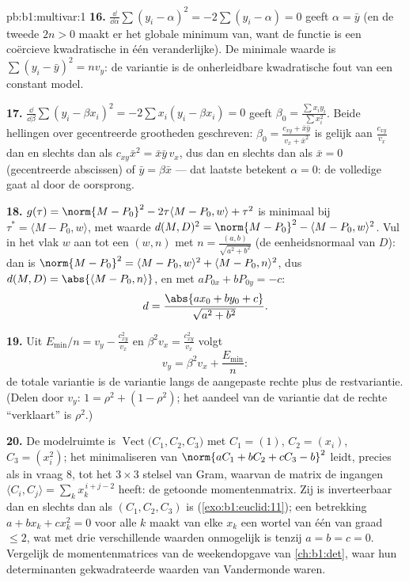 \begin{solution}{pb:b1:multivar:1}
\textbf{16.} $\frac{\dd}{\dd\alpha}\sum(y_i - \alpha)^2 =
-2\sum(y_i - \alpha) = 0$ geeft $\alpha = \bar y$ (en de tweede
 $2n > 0$ maakt er het globale minimum van, want de
functie is een coërcieve kwadratische in één veranderlijke). De
minimale waarde is $\sum(y_i - \bar y)^2 = n v_y$: de variantie is
de onherleidbare kwadratische fout van een constant model.

\textbf{17.} $\frac{\dd}{\dd\beta}\sum(y_i - \beta x_i)^2 =
-2\sum x_i(y_i - \beta x_i) = 0$ geeft $\beta_0 = \frac{\sum
x_iy_i}{\sum x_i^2}$. Beide hellingen over gecentreerde grootheden
geschreven: $\beta_0 = \frac{c_{xy} + \bar x\bar y}{v_x + \bar
x^2}$ is gelijk aan $\frac{c_{xy}}{v_x}$ dan en slechts dan als
$c_{xy}\bar x^2 = \bar x\bar y\,v_x$, dus dan en slechts dan als
$\bar x = 0$ (gecentreerde abscissen) of $\bar y = \beta\bar x$ ---
dat laatste betekent $\alpha = 0$: de volledige 
gaat al door de oorsprong.

\textbf{18.} $g(\tau) = \norm{M - P_0}^2 - 2\tau\langle M - P_0,
w\rangle + \tau^2$ is minimaal bij $\tau^* = \langle M - P_0,
w\rangle$, met waarde $d(M,D)^2 = \norm{M - P_0}^2 - \langle M -
P_0, w\rangle^2$. Vul in het vlak $w$ aan tot een 
 $(w, n)$ met $n = \frac{(a, b)}{\sqrt{a^2+b^2}}$ (de
eenheidsnormaal van $D$): dan is $\norm{M - P_0}^2 = \langle M -
P_0, w\rangle^2 + \langle M - P_0, n\rangle^2$, dus $d(M, D) =
\abs{\langle M - P_0, n\rangle}$, en met $aP_{0x} + bP_{0y} = -c$:
\[
d = \frac{\abs{a x_0 + b y_0 + c}}{\sqrt{a^2 + b^2}} .
\]

\textbf{19.} Uit $E_{\min}/n = v_y - \frac{c_{xy}^2}{v_x}$ en
$\beta^2 v_x = \frac{c_{xy}^2}{v_x}$ volgt
\[
v_y = \beta^2 v_x + \frac{E_{\min}}n :
\]
de totale variantie is de variantie langs de aangepaste rechte plus
de restvariantie. (Delen door $v_y$: $1 = \rho^2 + (1 - \rho^2)$;
het aandeel van de variantie dat de rechte ``verklaart'' is
$\rho^2$.)

\textbf{20.} De modelruimte is $\operatorname{Vect}\bigl(C_1, C_2,
C_3\bigr)$ met $C_1 = (1)$, $C_2 = (x_i)$, $C_3 = (x_i^2)$; het
minimaliseren van $\norm{aC_1 + bC_2 + cC_3 - b}^2$ leidt, precies
als in vraag 8, tot het $3\times3$ stelsel van Gram, waarvan de
matrix de ingangen $\langle C_i, C_j\rangle = \sum_k
x_k^{\,i+j-2}$ heeft: de getoonde momentenmatrix. Zij is
inverteerbaar dan en slechts dan als $(C_1, C_2, C_3)$  is
(\cref{exo:b1:euclid:11}); een betrekking $a + bx_k + cx_k^2 = 0$
voor alle $k$ maakt van elke $x_k$ een wortel van één  van
graad $\leq 2$, wat met drie verschillende waarden onmogelijk is
tenzij $a = b = c = 0$. Vergelijk de momentenmatrices van de
weekendopgave van \cref{ch:b1:det}, waar hun determinanten
gekwadrateerde waarden van Vandermonde waren.


\end{solution}
